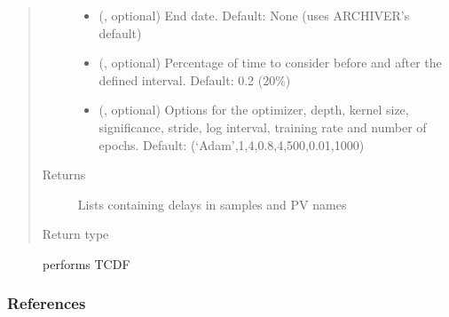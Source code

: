 \documentclass[letterpaper,10pt,english]{sphinxmanual}
\begin{document}
\begin{fulllineitems}
\begin{fulllineitems}
\begin{quote}
\begin{description}
\begin{itemize}
\item {} 
\sphinxAtStartPar
{} (, optional) \textendash{} End date. Default: None (uses ARCHIVER’s default)

\item {} 
\sphinxAtStartPar
{} (, optional) \textendash{} Percentage of time to consider before and after the defined interval. Default: 0.2 (20\%)

\item {} 
\sphinxAtStartPar
{} (, optional) \textendash{} Options for the optimizer, depth, kernel size, significance, stride, log interval, training rate and number of epochs. Default: (‘Adam’,1,4,0.8,4,500,0.01,1000)

\end{itemize}

\item[{Returns}] \leavevmode
\sphinxAtStartPar
Lists containing delays in samples and PV names

\item[{Return type}] \leavevmode
\sphinxAtStartPar
{}

\end{description}\end{quote}


\nopagebreak

\begin{description}
\item[{}] \leavevmode
\sphinxAtStartPar
performs TCDF

\end{description}


\subsubsection*{References}

\end{fulllineitems}



\end{fulllineitems}
\end{document}
